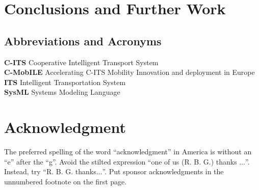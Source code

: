 \documentclass[conference]{IEEEtran}
\begin{document}
\section{Conclusions and Further Work}



\subsection{Abbreviations and Acronyms}\label{AA}
\noindent \textbf{C-ITS} Cooperative Intelligent Transport System\\
\textbf{C-MobILE} Accelerating C-ITS Mobility Innovation and deployment in Europe\\
\textbf{ITS} Intelligent Transportation System\\
\textbf{SysML} Systems Modeling Language





\section*{Acknowledgment}

The preferred spelling of the word ``acknowledgment'' in America is without 
an ``e'' after the ``g''. Avoid the stilted expression ``one of us (R. B. 
G.) thanks $\ldots$''. Instead, try ``R. B. G. thanks$\ldots$''. Put sponsor 
acknowledgments in the unnumbered footnote on the first page.
\end{document}
